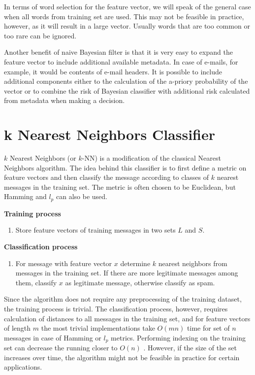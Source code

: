 \documentclass[12pt]{report}
\begin{document}
In terms of word selection for the feature vector, we will speak of the general case when all words from training set are used. This may not be feasible in practice, however, as it will result in a large vector. Usually words that are too common or too rare can be ignored.

Another benefit of naive Bayesian filter is that it is very easy to expand the feature vector to include additional available metadata. In case of e-mails, for example, it would be contents of e-mail headers. It is possible to include additional components either to the calculation of the a-priory probability of the vector or to combine the risk of Bayesian classifier with additional risk calculated from metadata when making a decision.

\newpage

\section{k Nearest Neighbors Classifier}

$k$ Nearest Neighbors (or $k$-NN) is a modification of the classical Nearest Neighbors algorithm. The idea behind this classifier is to first define a metric on feature vectors and then classify the message according to classes of $k$ nearest messages in the training set. The metric is often chosen to be Euclidean, but Hamming and $l_p$ can also be used.

\textbf{Training process}

\begin{enumerate}
	\item Store feature vectors of training messages in two sets $L$ and $S$.
\end{enumerate}

\textbf{Classification process}

\begin{enumerate}
	\item For message with feature vector $x$ determine $k$ nearest neighbors from messages in the training set. If there are more legitimate messages among them, classify $x$ as legitimate message, otherwise classify as spam.
\end{enumerate}

Since the algorithm does not require any preprocessing of the training dataset, the training process is trivial. The classification process, however, requires calculation of distances to all messages in the training set, and for feature vectors of length $m$ the most trivial implementations take $O(mn)$ time for set of $n$ messages in case of Hamming or $l_p$ metrics. Performing indexing on the training set can decrease the running closer to $O(n)$ \cite{Tretyakov}. However, if the size of the set increases over time, the algorithm might not be feasible in practice for certain applications.
\end{document}
